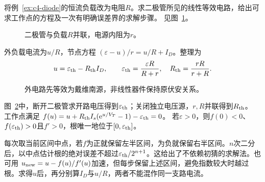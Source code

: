 \begin{example}[有限电阻负载下的工作点]\label{ex:c4-diode-load}
将例~\ref{ex:c4-diode}的恒流负载改为电阻$R$。求二极管所见的线性等效电路，给出可求工作点的方程及一次有明确误差界的求解步骤。 见图~\ref{fig:c4-diode-load-q}。
\end{example}

\begin{figure}[H]\centering
{}
\caption{二极管与负载$R$并联，电源内阻为$r$。}\label{fig:c4-diode-load-q}
\end{figure}
\begin{solution}
外负载电流为$u/R$，节点方程
$(\varepsilon-u)/r=u/R+I_D$。整理为
\[
 u=\varepsilon_{\rm th}-R_{\rm th}I_D,\qquad
 \varepsilon_{\rm th}=\frac{\varepsilon R}{R+r},\quad
 R_{\rm th}=\frac{rR}{r+R}.
\]

\begin{figure}[H]\centering
{}
\caption{外电路先等效为戴维南源，非线性器件保持原伏安关系。}\label{fig:c4-diode-load-s}
\end{figure}

图~\ref{fig:c4-diode-load-s}中，断开二极管求开路电压得到$\varepsilon_{\rm th}$；关闭独立电压源，$r,R$并联得到$R_{\rm th}$。
工作点满足
$f(u)=u+R_{\rm th}I_s(\mathrm e^{u/V_T}-1)-\varepsilon_{\rm th}=0$。
若$\varepsilon>0$，则$f(0)<0$、$f(\varepsilon_{\rm th})>0$且$f'>0$，根唯一地位于$[0,\varepsilon_{\rm th}]$。

每次取当前区间中点，若$f$为正就保留左半区间，为负就保留右半区间。$n$次二分后，以中点估计根的绝对误差不超过$\varepsilon_{\rm th}/2^{n+1}$。这给出了不依赖初猜的求解法。也可用
$u_{\rm new}=u-f(u)/f'(u)$加速，但每步保留上述区间，避免指数较大时越过根。求得$u$后，再分别算$I_D$与$u/R$，两者不能混作同一支路电流。
\end{solution}



